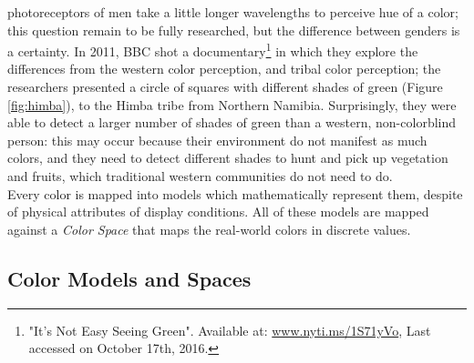 photoreceptors of men take a little longer wavelengths to perceive hue of a color; this question remain
to be fully researched, but the difference between genders is a certainty. In 2011, BBC shot a
documentary\footnote{\label{itsnoteasy}"It's Not Easy Seeing Green". Available at:
\url{www.nyti.ms/1S71yVo},
Last accessed on October 17th, 2016.} in which they explore the differences from the western color
perception, and tribal color perception; the researchers presented a circle of squares with different
shades of green (Figure \ref{fig:himba}), to the Himba tribe from Northern Namibia. Surprisingly, they were able to detect a larger
number of shades of green than a western, non-colorblind person: this may occur because their environment do not
manifest as much colors, and they need to detect different shades to hunt and pick up vegetation and
fruits, which traditional western communities do not need to do. \\
%
Every color is mapped into models which mathematically represent them, despite of physical attributes of display conditions.
All of these models are mapped against a \emph{Color Space} that maps the real-world colors in discrete values.
%
%
\subsection{Color Models and Spaces}
\label{subsec:colormodelspaces}
%

